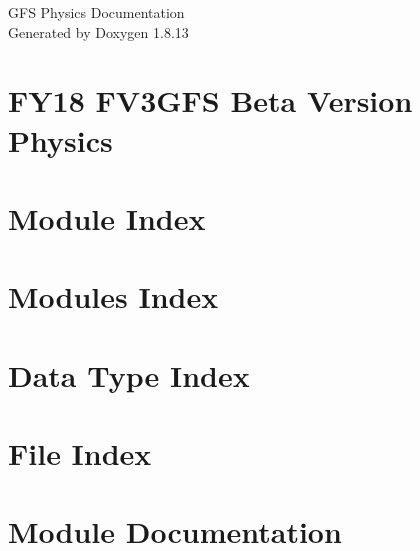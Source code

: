 \documentclass[twoside]{book}
\newcommand{\+}{\discretionary{\mbox{\scriptsize$\hookleftarrow$}}{}{}}
\newcommand{\clearemptydoublepage}{%
  \newpage{\pagestyle{empty}\cleardoublepage}%
}
\begin{document}
\hypersetup{pageanchor=false,
             bookmarksnumbered=true,
             pdfencoding=unicode
            }
\begin{titlepage}
\vspace*{7cm}
\begin{center}%
{\Large G\+FS Physics Documentation }\\
\vspace*{1cm}
{\large Generated by Doxygen 1.8.13}\\
\end{center}
\end{titlepage}
\clearemptydoublepage
{}
\tableofcontents
\clearemptydoublepage
{}
\hypersetup{pageanchor=true}

\chapter{F\+Y18 F\+V3\+G\+FS Beta Version Physics}
\label{index}\hypertarget{index}{}
\chapter{Module Index}

\chapter{Modules Index}

\chapter{Data Type Index}

\chapter{File Index}

\chapter{Module Documentation}
























\end{document}
